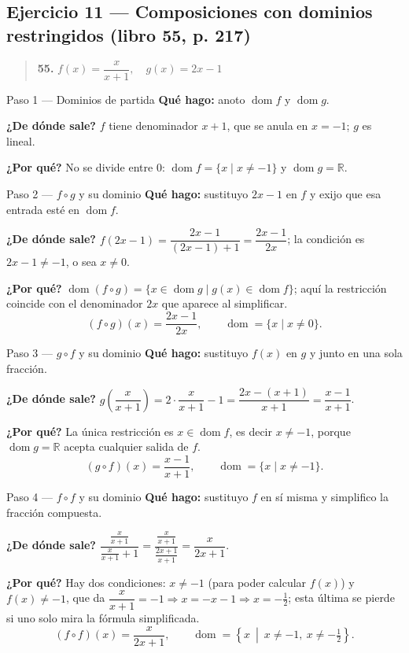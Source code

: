 \documentclass[11pt]{article}
\begin{document}
\subsection*{Ejercicio 11 — Composiciones con dominios restringidos (libro 55, p. 217)}

\begin{quote}
\textbf{55.} $f(x)=\dfrac{x}{x+1}, \quad g(x)=2x-1$
\end{quote}

\begin{paso}{Paso 1 --- Dominios de partida}
\textbf{Qué hago:} anoto $\operatorname{dom} f$ y $\operatorname{dom} g$.

\textbf{¿De dónde sale?} $f$ tiene denominador $x+1$, que se anula en $x=-1$; $g$ es lineal.

\textbf{¿Por qué?} No se divide entre $0$: $\operatorname{dom} f=\{x\mid x\neq -1\}$ y $\operatorname{dom} g=\mathbb{R}$.
\end{paso}

\begin{paso}{Paso 2 --- $f\circ g$ y su dominio}
\textbf{Qué hago:} sustituyo $2x-1$ en $f$ y exijo que esa entrada esté en $\operatorname{dom} f$.

\textbf{¿De dónde sale?} $f(2x-1)=\dfrac{2x-1}{(2x-1)+1}=\dfrac{2x-1}{2x}$; la condición es $2x-1\neq -1$, o sea $x\neq 0$.

\textbf{¿Por qué?} $\operatorname{dom}(f\circ g)=\{x\in\operatorname{dom} g\mid g(x)\in\operatorname{dom} f\}$; aquí la restricción coincide con el denominador $2x$ que aparece al simplificar.
\[
(f\circ g)(x)=\frac{2x-1}{2x},\qquad \operatorname{dom}=\{x\mid x\neq 0\}.
\]
\end{paso}

\begin{paso}{Paso 3 --- $g\circ f$ y su dominio}
\textbf{Qué hago:} sustituyo $f(x)$ en $g$ y junto en una sola fracción.

\textbf{¿De dónde sale?} $g\!\left(\dfrac{x}{x+1}\right)=2\cdot\dfrac{x}{x+1}-1=\dfrac{2x-(x+1)}{x+1}=\dfrac{x-1}{x+1}$.

\textbf{¿Por qué?} La única restricción es $x\in\operatorname{dom} f$, es decir $x\neq -1$, porque $\operatorname{dom} g=\mathbb{R}$ acepta cualquier salida de $f$.
\[
(g\circ f)(x)=\frac{x-1}{x+1},\qquad \operatorname{dom}=\{x\mid x\neq -1\}.
\]
\end{paso}

\begin{paso}{Paso 4 --- $f\circ f$ y su dominio}
\textbf{Qué hago:} sustituyo $f$ en sí misma y simplifico la fracción compuesta.

\textbf{¿De dónde sale?} $\dfrac{\frac{x}{x+1}}{\frac{x}{x+1}+1}=\dfrac{\frac{x}{x+1}}{\frac{2x+1}{x+1}}=\dfrac{x}{2x+1}$.

\textbf{¿Por qué?} Hay dos condiciones: $x\neq -1$ (para poder calcular $f(x)$) y $f(x)\neq -1$, que da $\dfrac{x}{x+1}=-1\Rightarrow x=-x-1\Rightarrow x=-\tfrac12$; esta última se pierde si uno solo mira la fórmula simplificada.
\[
(f\circ f)(x)=\frac{x}{2x+1},\qquad \operatorname{dom}=\left\{x\ \middle|\ x\neq -1,\ x\neq -\tfrac12\right\}.
\]
\end{paso}
\end{document}
